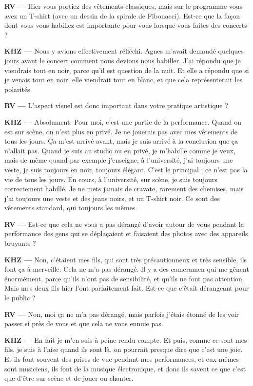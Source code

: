 \documentclass[a4paper,12pt]{article}
\begin{document}
\textbf{RV ---} Hier vous portiez des vêtements classiques, mais sur le programme vous avez un T-shirt (avec un dessin de la spirale de Fibonacci). Est-ce que la façon dont vous vous habillez est importante pour vous lorsque vous faites des concerts ?

\textbf{KHZ ---} Nous y avions effectivement réfléchi. Agnes m'avait demandé quelques jours avant le concert comment nous devions nous habiller. J'ai répondu que je viendrais tout en noir, parce qu'il est question de la nuit. Et elle a répondu que si je venais tout en noir, elle viendrait tout en blanc, et que cela représenterait les polarités.

\textbf{RV ---} L'aspect visuel est donc important dans votre pratique artistique ?

\textbf{KHZ ---} Absolument. Pour moi, c'est une partie de la performance. Quand on est sur scène, on n'est plus en privé. Je ne jouerais pas avec mes vêtements de tous les jours. Ça m'est arrivé avant, mais je suis arrivé à la conclusion que ça n'allait pas. Quand je suis au studio ou en privé, je m'habille comme je veux, mais de même quand par exemple j'enseigne, à l'université, j'ai toujours une veste, je suis toujours en noir, toujours élégant. C'est le principal : ce n'est pas la vie de tous les jours. En cours, à l'université, sur scène, je suis toujours correctement habillé. Je ne mets jamais de cravate, rarement des chemises, mais j'ai toujours une veste et des jeans noirs, et un T-shirt noir. Ce sont des vêtements standard, qui toujours les mêmes.

\textbf{RV ---} Est-ce que cela ne vous a pas dérangé d'avoir autour de vous pendant la performance des gens qui se déplaçaient et faisaient des photos avec des appareils bruyants ?

\textbf{KHZ ---} Non, c'étaient mes fils, qui sont très précautionneux et très sensible, ils font ça à merveille. Cela ne m'a pas dérangé. Il y a des cameramen qui me gênent énormément, parce qu'ils n'ont pas de sensibilité, et qu'ils ne font pas attention. Mais mes deux fils hier l'ont parfaitement fait. Est-ce que c'était dérangeant pour le public ?

\textbf{RV ---} Non, moi ça ne m'a pas dérangé, mais parfois j'étais étonné de les voir passer si près de vous et que cela ne vous ennuie pas.

\textbf{KHZ ---} En fait je m'en suis à peine rendu compte. Et puis, comme ce sont mes fils, je suis à l'aise quand ils sont là, on pourrait presque dire que c'est une joie. Et ils font souvent des prises de vue pendant mes performances, et eux-mêmes sont musiciens, ils font de la musique électronique, et donc ils savent ce que c'est que d'être sur scène et de jouer ou chanter.
\end{document}

